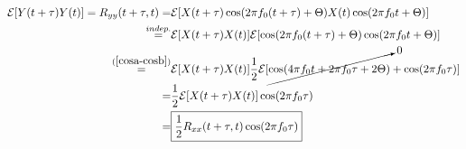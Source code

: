 \begin{align}
	\mathcal{E}[Y(t+\tau)Y(t)] = R_{yy}(t+\tau,t) =& \mathcal{E} [X( t + \tau) \cos(2 \pi f_0 (t + \tau) + \Theta) X(t) \cos(2 \pi f_0 t + \Theta)] \nonumber \\
	\overset{indep.}{=}& \mathcal{E}[X(t+\tau)X(t)] \mathcal{E}[\cos(2\pi f_0(t+\tau) +\Theta)\cos(2\pi f_0t + \Theta)] \nonumber \\
	\overset{(\ref{cosa-cosb})}{=}& \mathcal{E}[X(t+\tau)X(t)]\frac{1}{2}\mathcal{E}[\cancelto{0}{\cos(4\pi f_0t+2\pi f_0\tau+2\Theta)} + \cos(2\pi f_0\tau)] \nonumber \\
	=& \frac{1}{2} \mathcal{E}[X(t+\tau)X(t)] \cos(2\pi f_0\tau) \nonumber \\ 
	=& \boxed{ \frac{1}{2} R_{xx}(t+\tau,t)\cos(2\pi f_0\tau)}
\end{align}